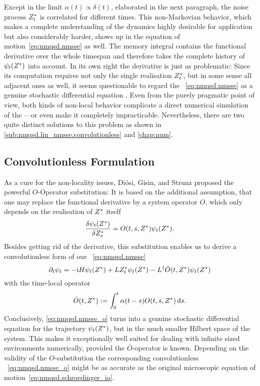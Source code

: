 Except in the limit $\alpha(t) \propto \delta(t)$, elaborated in the next paragraph, the noise process ${Z}^*_t$ is correlated for different times.
This non-Markovian behavior, which makes a complete understanding of the dynamics highly desirable for application but also considerably harder, shows up in the equation of motion~\ref{eq:nmqsd.nmsse} as well.
The memory integral contains the functional derivative over the whole timespan and therefore takes the complete history of $\psitZ$ into account.
In its own right the derivative is just as problematic:
Since its computation requires not only the single realisation ${Z}^*_t$, but in some sense all adjacent ones as well, it seems questionable to regard the \NMSSE~\ref{eq:nmqsd.nmsse} as a genuine stochastic differential equation \cite{GaWi02_real_nmsse}.
Even from the purely pragmatic point of view, both kinds of non-local behavior complicate a direct numerical simulation of the \NMSSE---or even make it completely impracticable.
Nevertheless, there are two quite distinct solutions to this problem as shown in \autoref{sub:nmqsd.lin_nmsse.convolutionless} and \autoref{chap:num}.


\subsection{Convolutionless Formulation}
\label{sub:nmqsd.lin_nmsse.convolutionless}

As a cure for the non-locality issues, Diósi, Gisin, and Strunz \cite{DiGiSt98_nmqsd} proposed the powerful $O$-Operator substitution:
It is based on the additional assumption, that one may replace the functional derivative by a system operator $O$, which only depends on the realisation of ${Z}^*$ itself
\begin{equation}
  \frac{\delta \psi_t({Z}^*)}{\delta {Z}^*_s} = O(t, s, {Z}^*) \psi_t({Z}^*).
  \label{eq:nmqsd.o_substition}
\end{equation}
Besides getting rid of the derivative, this substitution enables us to derive a convolutionless form of our \NMSSE~\ref{eq:nmqsd.nmsse}
\begin{equation}
  \partial_t \psi_t = -\mathrm{i}H\psi_t({Z}^*)  +  L{Z}^*_t\psi_t({Z}^*)  -  L^\dagger \bar O(t, {Z}^*) \psi_t({Z}^*)
  \label{eq:nmqsd.nmsse_o}
\end{equation}
with the time-local operator
\begin{equation}
  \bar O(t, {Z}^*) := \int_0^t \alpha(t - s) O(t, s, {Z}^*) \, \mathrm{d} s.
  \label{eq:nmqsd.o_bar}
\end{equation}
Conclusively, \autoref{eq:nmqsd.nmsse_o} turns into a genuine stochastic differential equation for the trajectory $\psi_t({Z}^*)$, but in the much smaller Hilbert space of the system.
This makes it exceptionally well suited for dealing with infinite sized environments numerically, provided the $\bar O$-operator is known.
Depending on the validity of the $O$-substitution the corresponding convolutionless \NMSSE~\ref{eq:nmqsd.nmsse_o} might be as accurate as the original microscopic equation of motion~\ref{eq:nmqsd.schroedinger_ia}.

